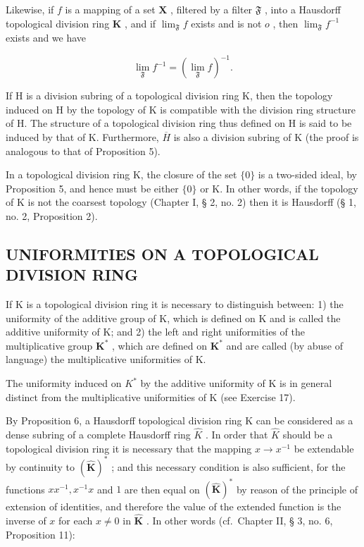 Likewise, if \(f\) is a mapping of a set \(\mathbf{X}\) , filtered by a filter \(\mathfrak{F}\) , into a Hausdorff topological division ring \(\mathbf{K}\) , and if \(\lim_{\mathfrak{F}} f\) exists and is not \(o\) , then \(\lim_{\mathfrak{F}} f^{-1}\) exists and we have

\[
\lim _ {\mathfrak {F}} f ^ {- 1} = (\lim _ {\mathfrak {F}} f) ^ {- 1}.\tag{4}
\]

If H is a division subring of a topological division ring K, then the topology induced on H by the topology of K is compatible with the division ring structure of H. The structure of a topological division ring thus defined on H is said to be induced by that of K. Furthermore, \(\overline{H}\) is also a division subring of K (the proof is analogous to that of Proposition 5).

In a topological division ring K, the closure of the set \(\{0\}\) is a two-sided ideal, by Proposition 5, and hence must be either \(\{0\}\) or K. In other words, if the topology of K is not the coarsest topology (Chapter I, § 2, no. 2) then it is Hausdorff (§ 1, no. 2, Proposition 2).

\subsection{UNIFORMITIES ON A TOPOLOGICAL DIVISION RING}

If K is a topological division ring it is necessary to distinguish between: 1) the uniformity of the additive group of K, which is defined on K and is called the additive uniformity of K; and 2) the left and right uniformities of the multiplicative group \(\mathbf{K}^*\) , which are defined on \(\mathbf{K}^*\) and are called (by abuse of language) the multiplicative uniformities of K.

The uniformity induced on \(K^{*}\) by the additive uniformity of K is in general distinct from the multiplicative uniformities of K (see Exercise 17).

By Proposition 6, a Hausdorff topological division ring K can be considered as a dense subring of a complete Hausdorff ring \(\hat{K}\) . In order that \(\hat{K}\) should be a topological division ring it is necessary that the mapping \(x \to x^{-1}\) be extendable by continuity to \((\hat{\mathbf{K}})^{*}\) ; and this necessary condition is also sufficient, for the functions \(xx^{-1}, x^{-1}x\) and \(1\) are then equal on \((\hat{\mathbf{K}})^{*}\) by reason of the principle of extension of identities, and therefore the value of the extended function is the inverse of \(x\) for each \(x \neq 0\) in \(\hat{\mathbf{K}}\) . In other words (cf.~Chapter II, § 3, no. 6, Proposition 11):

